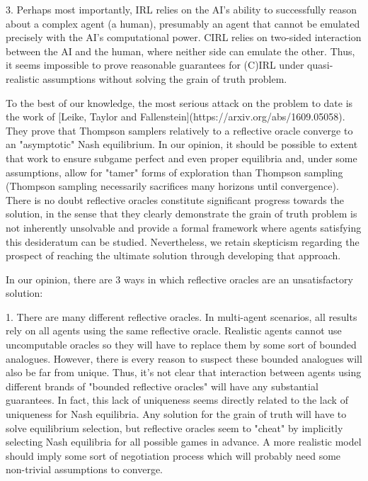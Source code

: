 \documentclass[a4paper]{article}
\begin{document}
3. Perhaps most importantly, IRL relies on the AI's ability to successfully reason about a complex agent (a human), presumably an agent that cannot be emulated precisely with the AI's computational power. CIRL relies on two-sided interaction between the AI and the human, where neither side can emulate the other. Thus, it seems impossible to prove reasonable guarantees for (C)IRL under quasi-realistic assumptions without solving the grain of truth problem.

To the best of our knowledge, the most serious attack on the problem to date is the work of [Leike, Taylor and Fallenstein](https://arxiv.org/abs/1609.05058). They prove that Thompson samplers relatively to a reflective oracle converge to an "asymptotic" Nash equilibrium. In our opinion, it should be possible to extent that work to ensure subgame perfect and even proper equilibria and, under some assumptions, allow for "tamer" forms of exploration than Thompson sampling (Thompson sampling necessarily sacrifices many horizons until convergence). There is no doubt reflective oracles constitute significant progress towards the solution, in the sense that they clearly demonstrate the grain of truth problem is not inherently unsolvable and provide a formal framework where agents satisfying this desideratum can be studied. Nevertheless, we retain skepticism regarding the prospect of reaching the ultimate solution through developing that approach.

In our opinion, there are 3 ways in which reflective oracles are an unsatisfactory solution:

1. There are many different reflective oracles. In multi-agent scenarios, all results rely on all agents using the same reflective oracle. Realistic agents cannot use uncomputable oracles so they will have to replace them by some sort of bounded analogues. However, there is every reason to suspect these bounded analogues will also be far from unique. Thus, it's not clear that interaction between agents using different brands of "bounded reflective oracles" will have any substantial guarantees. In fact, this lack of uniqueness seems directly related to the lack of uniqueness for Nash equilibria. Any solution for the grain of truth will have to solve equilibrium selection, but reflective oracles seem to "cheat" by implicitly selecting Nash equilibria for all possible games in advance. A more realistic model should imply some sort of negotiation process which will probably need some non-trivial assumptions to converge.
\end{document}
